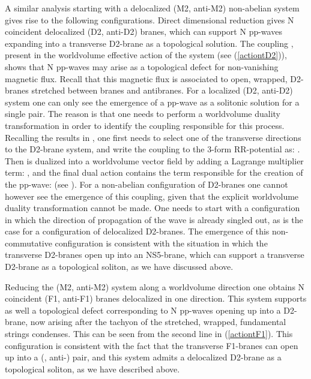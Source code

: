 \documentclass[12pt,a4paper]{article}
\begin{document}
A similar analysis starting with a delocalized (M2, anti-M2) 
non-abelian system 
gives rise to the following configurations. Direct dimensional reduction
gives N coincident delocalized (D2, anti-D2) branes, which can support N
pp-waves expanding into a transverse D2-brane as a topological solution.
The coupling 
\coordHE{}, present in the worldvolume effective
action of the system (see (\ref{actiontD2})),
shows that N pp-waves may arise as a topological defect for
non-vanishing magnetic flux. Recall that this magnetic flux
is associated to open, wrapped, D2-branes stretched between
branes and antibranes. For a localized (D2, anti-D2) system one can
only see the emergence of a pp-wave as a solitonic solution
for a single pair. The reason is that one needs to perform a
worldvolume duality transformation in order to identify the
coupling responsible for this process. Recalling the results in
\cite{HL1}, one first needs to select one of the transverse
directions to the D2-brane system, and write the coupling to the
3-form RR-potential as:
\coordHE{}.
Then \coordHE{} is dualized into a 
worldvolume vector field by adding a Lagrange multiplier term:
\coordHE{}, and the final dual action contains
the term responsible for the creation of the pp-wave:
\coordHE{} (see \cite{HL1}).
For a non-abelian configuration of D2-branes one cannot however
see the emergence of this coupling, given that the explicit
worldvolume duality transformation cannot be made. One needs to
start with a configuration in which the direction of propagation
of the wave is already singled out, as is the case for
a configuration of delocalized D2-branes.
The emergence of this non-commutative configuration
is consistent with the situation in which the transverse D2-branes
open up into an NS5-brane, which can support a transverse D2-brane as a 
topological soliton, as we have discussed above. 

Reducing the (M2, anti-M2) system along a 
worldvolume direction one obtains N coincident (F1, anti-F1) branes
delocalized in one direction.
This system supports as well a topological defect corresponding to
N pp-waves opening up into a D2-brane, 
now arising after the tachyon of the 
stretched, wrapped, fundamental strings condenses. 
This can be seen from the second line in (\ref{actiontF1}).
This configuration is
consistent with the fact that the transverse F1-branes
can open up into a (\coordHE{}, anti-\coordHE{}) pair, and this system 
admits a delocalized D2-brane as a topological soliton, as we
have described above.
\end{document}
